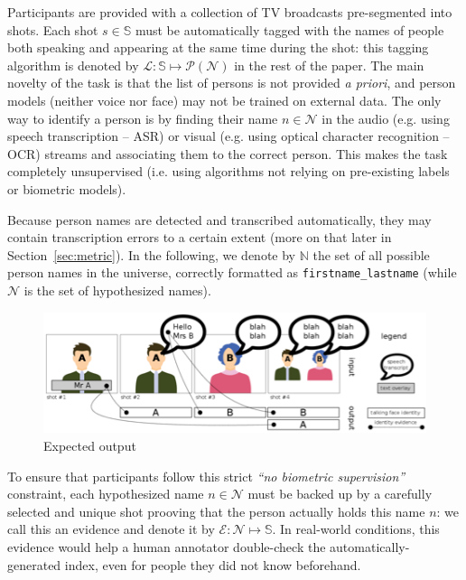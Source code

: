 \documentclass{acm_proc_article-me}
\newcommand\refNames{\mathbb{N}}
\newcommand\shots{\mathbb{S}}
\newcommand\hypEvidences{\mathcal{E}}
\newcommand\hypLabels{\mathcal{L}}
\newcommand\hypNames{\mathcal{N}}
\begin{document}
Participants are provided with a collection of TV broadcasts pre-segmented into shots.
Each shot $s \in \shots$ must be automatically tagged with the names of people both speaking and appearing at the same time during the shot: this tagging algorithm is denoted by $\hypLabels : \shots \mapsto \mathcal{P}(\hypNames)$ in the rest of the paper.
The main novelty of the task is that the list of persons is not provided \emph{a priori}, and person models (neither voice nor face) may not be trained on external data. The only way to identify a person is by finding their name $n \in \hypNames$ in the audio (e.g. using speech transcription -- ASR) or visual (e.g. using optical character recognition -- OCR) streams and associating them to the correct person. This makes the task completely unsupervised (i.e. using algorithms not relying on pre-existing labels or biometric models).

Because person names are detected and transcribed automatically, they may contain transcription errors to a certain extent (more on that later in Section~\ref{sec:metric}). In the following, we denote by $\refNames$ the set of all possible person names in the universe, correctly formatted as \texttt{firstname\_lastname} (while $\hypNames$ is the set of hypothesized names).

\begin{figure}[!htb]
 \center
 \includegraphics[width=1\linewidth]{figs/evidence.png}
 \centering
 \caption {Expected output}
 \label{fig:evidence}
\end{figure}

To ensure that participants follow this strict \emph{``no biometric supervision''} constraint, each hypothesized name $n \in \hypNames$ must be backed up by a carefully selected and unique shot prooving that the person actually holds this name $n$: we call this an evidence and denote it by $\hypEvidences : \hypNames \mapsto \shots$. In real-world conditions, this evidence would help a human annotator double-check the automatically-generated index, even for people they did not know beforehand.
\end{document}
